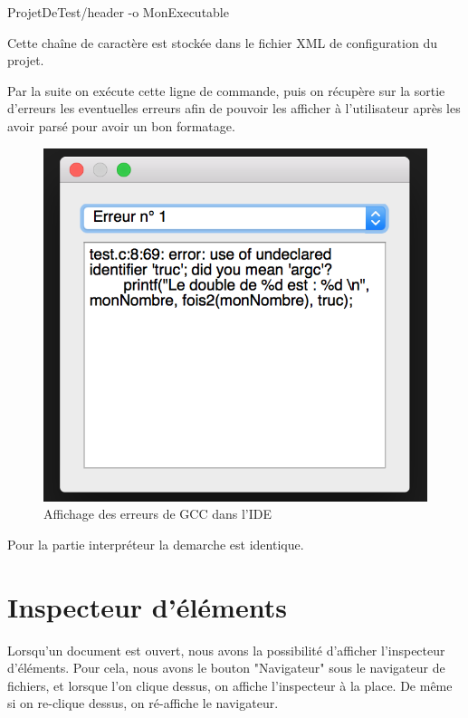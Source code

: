 \documentclass[a4paper,12pt]{article}
\begin{document}
		ProjetDeTest/header -o MonExecutable

		Cette chaîne de caractère est stockée dans le fichier XML de configuration du projet.

		Par la suite on exécute cette ligne de commande, puis on récupère sur la sortie d'erreurs les eventuelles erreurs afin de pouvoir les afficher à l'utilisateur après les avoir parsé pour avoir un bon formatage.

		\newpage

			\begin{figure}[h!]
				\begin{center}
					\includegraphics[scale=0.7]{images/fenErreurEx}
					\caption{Affichage des erreurs de GCC dans l'IDE}
				\end{center}
			\end{figure}

		Pour la partie interpréteur la demarche est identique. 


\section{Inspecteur d'éléments}

	Lorsqu'un document est ouvert, nous avons la possibilité d'afficher l'inspecteur d'éléments. Pour cela, nous avons le bouton "Navigateur" sous le navigateur de fichiers, et lorsque l'on clique dessus, on affiche l'inspecteur à la place. De même si on re-clique dessus, on ré-affiche le navigateur.
	
\end{document}
